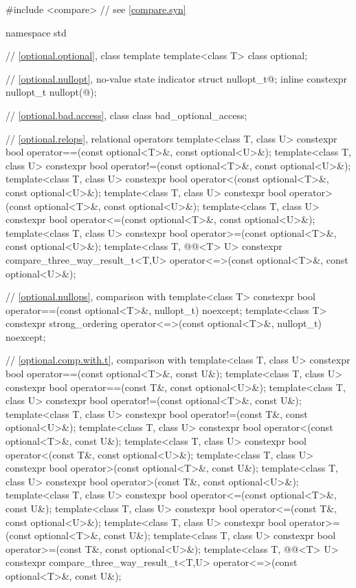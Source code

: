 %
\begin{codeblock}
#include <compare>              // see \ref{compare.syn}

namespace std {
  // \ref{optional.optional}, class template 
  template<class T>
    class optional;

  // \ref{optional.nullopt}, no-value state indicator
  struct nullopt_t{@\seebelow@};
  inline constexpr nullopt_t nullopt(@\unspec@);

  // \ref{optional.bad.access}, class 
  class bad_optional_access;

  // \ref{optional.relops}, relational operators
  template<class T, class U>
    constexpr bool operator==(const optional<T>&, const optional<U>&);
  template<class T, class U>
    constexpr bool operator!=(const optional<T>&, const optional<U>&);
  template<class T, class U>
    constexpr bool operator<(const optional<T>&, const optional<U>&);
  template<class T, class U>
    constexpr bool operator>(const optional<T>&, const optional<U>&);
  template<class T, class U>
    constexpr bool operator<=(const optional<T>&, const optional<U>&);
  template<class T, class U>
    constexpr bool operator>=(const optional<T>&, const optional<U>&);
  template<class T, @@<T> U>
    constexpr compare_three_way_result_t<T,U>
      operator<=>(const optional<T>&, const optional<U>&);

  // \ref{optional.nullops}, comparison with 
  template<class T> constexpr bool operator==(const optional<T>&, nullopt_t) noexcept;
  template<class T>
    constexpr strong_ordering operator<=>(const optional<T>&, nullopt_t) noexcept;

  // \ref{optional.comp.with.t}, comparison with 
  template<class T, class U> constexpr bool operator==(const optional<T>&, const U&);
  template<class T, class U> constexpr bool operator==(const T&, const optional<U>&);
  template<class T, class U> constexpr bool operator!=(const optional<T>&, const U&);
  template<class T, class U> constexpr bool operator!=(const T&, const optional<U>&);
  template<class T, class U> constexpr bool operator<(const optional<T>&, const U&);
  template<class T, class U> constexpr bool operator<(const T&, const optional<U>&);
  template<class T, class U> constexpr bool operator>(const optional<T>&, const U&);
  template<class T, class U> constexpr bool operator>(const T&, const optional<U>&);
  template<class T, class U> constexpr bool operator<=(const optional<T>&, const U&);
  template<class T, class U> constexpr bool operator<=(const T&, const optional<U>&);
  template<class T, class U> constexpr bool operator>=(const optional<T>&, const U&);
  template<class T, class U> constexpr bool operator>=(const T&, const optional<U>&);
  template<class T, @@<T> U>
    constexpr compare_three_way_result_t<T,U>
      operator<=>(const optional<T>&, const U&);

}
\end{codeblock}
